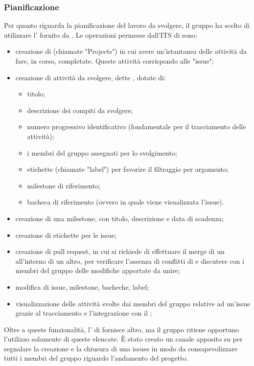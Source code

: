 \subsubsection{Pianificazione}
Per quanto riguarda la pianificazione del lavoro da svolgere, il gruppo \Gruppo{} ha scelto di utilizzare l' fornito da .
Le operazioni permesse dall'ITS di  sono:
\begin{itemize}
	\item creazione di  (chiamate "Projects") in cui avere un'istantanea delle attività da fare, in corso, completate. Queste attività corrispondo alle "issue";
	\item creazione di attività da svolgere, dette , dotate di:
	\begin{itemize}
		\item titolo;
		\item descrizione dei compiti da svolgere;
		\item numero progressivo identificativo (fondamentale per il tracciamento delle attività);
		\item i membri del gruppo assegnati per lo svolgimento;
		\item etichette (chiamate "label") per favorire il filtraggio per argomento;
		\item milestone di riferimento;
		\item bacheca di riferimento (ovvero in quale  viene visualizzata l'issue).
	\end{itemize}
	\item creazione di una milestone, con titolo, descrizione e data di scadenza;
	\item creazione di etichette per le issue;
	\item creazione di pull request, in cui si richiede di effettuare il merge di un  all'interno di un altro, per verificare l'assenza di conflitti di  e discutere con i membri del gruppo delle modifiche apportate da unire;
	\item modifica di issue, milestone, bacheche, label;
	\item visualizzazione delle attività svolte dai membri del gruppo relative ad un'issue grazie al tracciamento e l'integrazione con il  ;
\end{itemize}
Oltre a queste funzionalità, l' di  fornisce altro, ma il gruppo \Gruppo{} ritiene opportuno l'utilizzo solamente di queste elencate.
È stato creato un canale apposito su  per segnalare la creazione e la chiusura di una issues in modo da consapevolizzare tutti i membri del gruppo riguardo l'andamento del progetto.

